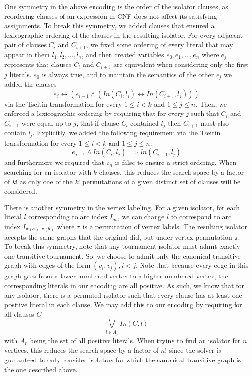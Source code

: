 \documentclass[conference]{IEEEtran}
\begin{document}
One symmetry in the above encoding is the order of the isolator clauses, as reordering clauses of an expression in CNF does not affect its satisfying assignments.  To break this symmetry, we added clauses that ensured a lexicographic ordering of the clauses in the resulting isolator.  For every adjacent pair of clauses $C_i$ and $C_{i+1}$, we fixed some ordering of every literal that may appear in them $l_1, l_2, \dots, l_n$, and then created variables $e_0, e_1, \dots, e_n$ where $e_j$ represents that clauses $C_i$ and $C_{i+1}$ are equivalent when considering only the first $j$ literals.  $e_0$ is always true, and to maintain the semantics of the other $e_j$ we added the clauses
$$e_j \leftrightarrow (e_{j-1} \land (In(C_i, l_j) \leftrightarrow In(C_{i+1}, l_j)))$$
via the Tseitin transformation for every $1 \le i < k$ and $1 \le j\le n$.  Then, we enforced a lexicographic ordering by requiring that for every $j$ such that $C_i$ and $C_{i+1}$ were equal up to $j$, that if clause $C_i$ contained $l_j$ then $C_{i+1}$ must also contain $l_j$.  Explicitly, we added the following requirement via the Tseitin transformation for every $1 \le i < k$ and $1 \le j\le n$:
$$e_{j-1} \land In(C_i, l_j) \implies In(C_{i+1}, l_j)$$
and furthermore we required that $e_n$ is false to ensure a strict ordering.  When searching for an isolator with $k$ clauses, this reduces the search space by a factor of $k!$ as only one of the $k!$ permutations of a given distinct set of clauses will be considered.

There is another symmetry in the vertex labeling.  For a given isolator, for each literal $l$ corresponding to arc index $I_{ab}$, we can change $l$ to correspond to arc index $I_{\pi(a),\pi(b)}$ where $\pi$ is a permutation of vertex labels. The resulting isolator accepts the same graphs that the original did, but under vertex permutation $\pi$.  To break this symmetry, note that any tournament isolator must admit exactly one transitive tournament.  So, we choose to admit only the canonical transitive graph with edges of the form $(v_i, v_j), i < j$.  Note that because every edge in this graph goes from a lower numbered vertex to a higher numbered vertex, the corresponding literals in our encoding are all positive.  As such, we know that for any isolator, there is a permuted isolator such that every clause has at least one positive literal in each clause.  We may add this to our encoding by requiring for all clauses $C$
$$\bigvee_{l \in A_p} In(C, l)$$
with $A_p$ being the set of all positive literals.    When trying to find an isolator for $n$ vertices, this reduces the search space by a factor of $n!$ since the solver is guaranteed to only consider isolators for which the canonical transitive graph is the one described above.
\end{document}
